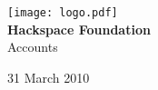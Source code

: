 


\begin{titlepage}
\begin{center}
\texttt{[image: logo.pdf]}\\[48pt]
{\bf \LARGE Hackspace Foundation}\\[36pt]
{\Large Accounts}

\vfill
31 March 2010

\end{center}
\end{titlepage}







